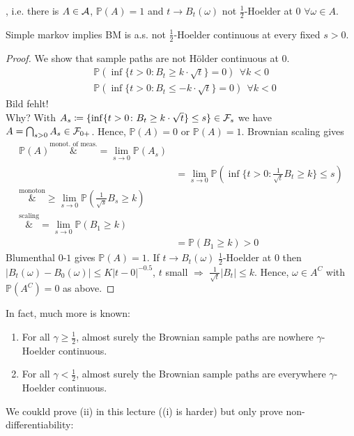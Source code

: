	
, i.e. there is $A\in\mathcal{A}$, $\mathbb{P}(A)=1$ and $t\to B_t(\omega)$ not $\frac{1}{2}$-Hoelder at $0$ $\forall \omega \in A$.

Simple markov implies BM is a.s. not $\frac{1}{2}$-Hoelder continuous at every fixed $s>0$.
\begin{proof}[Proof]
	We show that sample paths are not H\"older continuous at $0$.
	\begin{align*}
		&\mathbb{P}\left(\inf\{ t>0\colon B_t \geq k \cdot \sqrt{t}\}=0\right) \:\: \forall k <0\\
		&\mathbb{P}\left(\inf\{ t>0\colon B_t \leq -k \cdot \sqrt{t}\}=0\right) \:\: \forall k <0
	\end{align*}
	Bild fehlt! \\
	Why? With $A_s \coloneqq \{ \inf\{t>0\colon B_t \geq k\cdot\sqrt{t}\}\leq s\}\in \mathcal{F}_s$ we have $A = \bigcap_{s>0} A_s \in \mathcal{F}_{0+}$. Hence, $\mathbb{P}(A) = 0$ or $\mathbb{P}(A)=1$. Brownian scaling gives
	\begin{align*}
		\mathbb{P}(A) \overset{\text{monot. of meas.}}&{=} \lim_{s\to 0} \mathbb{P}(A_s) \\
					&= \lim_{s\to 0} \mathbb{P}\left(\inf\{t>0\colon \frac{1}{\sqrt{t}}B_t \geq k\}\leq s\right) \\
					\overset{\text{monoton}}&{\geq} \lim_{s\to 0} \mathbb{P}\left( \frac{1}{\sqrt{s}}B_s \geq k\right) \\
					\overset{\text{scaling}}&{=} \lim_{s\to 0} \mathbb{P}\left( B_1 \geq k\right) \\
					&=\mathbb{P}\left(B_1 \geq k\right) > 0
	\end{align*}
Blumenthal $0$-$1$ gives $\mathbb{P}(A)=1$. If $t\to B_t(\omega)$ $\frac{1}{2}$-Hoelder at $0$ then $\lvert B_t(\omega)-B_0(\omega)\rvert \leq K \lvert t - 0 \rvert^{-0.5}$, $t$ small $\Rightarrow$ $\frac{1}{\sqrt{t}} \lvert B_t \rvert \leq k$. Hence, $\omega \in A^C$ with $\mathbb{P}(A^C)=0$ as above.
\end{proof}
In fact, much more is known:
\begin{enumerate}[label=(\roman*)]
	\item
		For all $\gamma \geq \frac{1}{2}$, almost surely the Brownian sample paths are nowhere $\gamma$-Hoelder continuous.
	\item
		For all $\gamma < \frac{1}{2}$, almost surely the Brownian sample paths are everywhere $\gamma$-Hoelder continuous.
\end{enumerate}
We coukld prove (ii) in this lecture ((i) is harder) but only prove non-differentiability:

